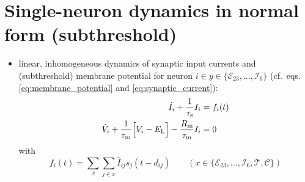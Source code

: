 \documentclass[10pt,a4paper,twoside,american]{article}
\theoremstyle{definitionstyle}
\newcommand{\RM}{R_\text{m}}
\newcommand{\tauM}{\tau_\text{m}}
\newcommand{\tauS}{\tau_\text{s}}
\begin{document}
\clearpage
\appendix
\section{Single-neuron dynamics in normal form (subthreshold)}
\label{sec:normal_form}
\begin{itemize}
\item linear, inhomogeneous dynamics of synaptic input currents and (subthreshold) membrane potential for neuron $i \in y\in\{\mathcal{E}_{23},\ldots,\mathcal{I}_{6}\}$ (cf.~eqs.\,\eqref{eq:membrane_potential} and \eqref{eq:synaptic_current}):
  \begin{equation}
    \label{eq:1st_order_ode}
    \begin{aligned}
      \dot{I}_{i} + \frac{1}{\tauS} I_{i} &= f_{i}(t)\\
      \dot{V}_{i} + \frac{1}{\tauM} \Bigl[ V_{i}-E_\text{L}\Bigr] - \frac{\RM}{\tauM} I_{i} &= 0
    \end{aligned}
  \end{equation}
  with
  \begin{equation}
	  f_{i}(t)=\sum_{x}\sum_{j\in x} \hat{I}_{ij} s_{j}(t-d_{ij})
    \qquad(x\in\{\mathcal{E}_{23},\ldots,\mathcal{I}_{6}, \mathcal{T}, \mathcal{C}\})
  \end{equation}


\end{itemize}
\end{document}
